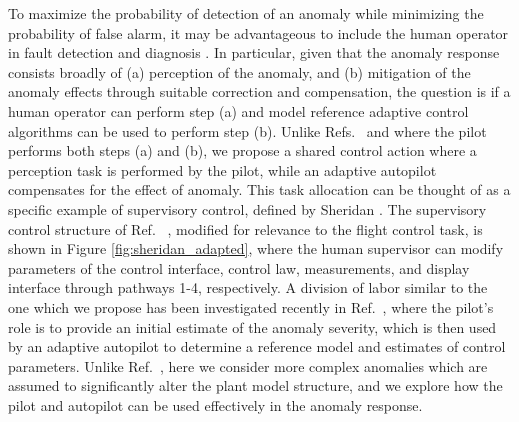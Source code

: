 To maximize the probability of detection of an anomaly while minimizing the probability of false alarm, it may be advantageous to include the human operator in fault detection and diagnosis \cite{sheridan2000human}. In particular, given that the anomaly response consists broadly of (a) perception of the anomaly, and (b) mitigation of the anomaly effects through suitable correction and compensation, the question is if a human operator can perform step (a) and model reference adaptive control algorithms can be used to perform step (b). Unlike Refs.~\cite{hess2015modeling} and \cite{hess2009modeling} where the pilot performs both steps (a) and (b), we propose a shared control action where a perception task is performed by the pilot, while an adaptive autopilot compensates for the effect of anomaly. This task allocation can be thought of as a specific example of supervisory control, defined by Sheridan \cite{sheridan1976toward, sheridan2011adaptive}. The supervisory control structure of Ref.~ \cite{sheridan2011adaptive}, modified for relevance to the flight control task, is shown in Figure \ref{fig:sheridan_adapted}, where the human supervisor can modify parameters of the control interface, control law, measurements, and display interface through pathways 1-4, respectively. A division of labor similar to the one which we propose has been investigated recently in Ref.~\cite{farjadian2017bumpless}, where the pilot's role is to provide an initial estimate of the anomaly severity, which is then used by an adaptive autopilot to determine a reference model and estimates of control parameters. Unlike Ref.~\cite{farjadian2017bumpless}, here we consider more complex anomalies which are assumed to significantly alter the plant model structure, and we explore how the pilot and autopilot can be used effectively in the anomaly response.

